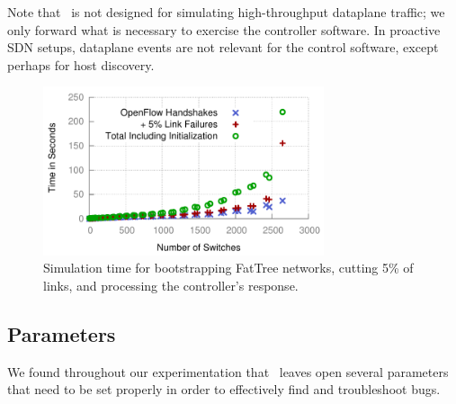 Note that \projectname~is not designed for simulating high-throughput dataplane
traffic; we only forward what is necessary to exercise the controller
software. In proactive SDN setups, dataplane events are not
relevant for the control software, except perhaps for host discovery.

\begin{figure}[t]
    \includegraphics[width=3.25in]{../graphs/scalability/scaling.pdf}
    \caption[]{\label{fig:scaling} Simulation time for bootstrapping FatTree
    networks, cutting 5\% of links, and processing the controller's response.}
\end{figure}

\subsection{Parameters}
\label{subsec:params}

We found throughout our experimentation that \projectname~leaves open several
parameters that need to be set properly in order to effectively find and troubleshoot bugs.

